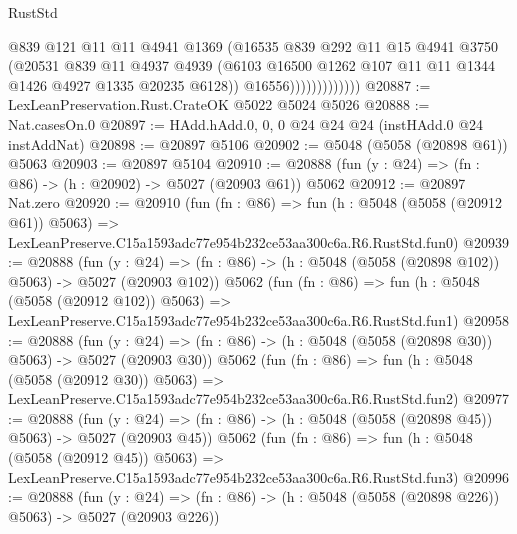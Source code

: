 \begin{lexlean}{RustStd}
\begin{coremodule}
                            @839
                            @121
                            @11
                            @11
                            @4941
                            @1369
                            (@16535
                              @839
                              @292
                              @11
                              @15
                              @4941
                              @3750
                              (@20531
                                @839
                                @11
                                @4937
                                @4939
                                (@6103
                                  @16500
                                  @1262
                                  @107
                                  @11
                                  @11
                                  @1344
                                  @1426
                                  @4927
                                  @1335
                                  @20235
                                  @6128))
                              @16556)))))))))))))
@20887 := LexLeanPreservation.Rust.CrateOK @5022 @5024 @5026
@20888 := Nat.casesOn.{0}
@20897 := HAdd.hAdd.{0, 0, 0} @24 @24 @24 (instHAdd.{0} @24 instAddNat)
@20898 := @20897 @5106
@20902 := @5048 (@5058 (@20898 @61)) @5063
@20903 := @20897 @5104
@20910 := @20888 (fun (y : @24) => (fn : @86) -> (h : @20902) -> @5027 (@20903 @61)) @5062
@20912 := @20897 Nat.zero
@20920 := @20910
    (fun (fn : @86) =>
    fun (h : @5048 (@5058 (@20912 @61)) @5063) =>
    LexLeanPreserve.C15a1593adc77e954b232ce53aa300c6a.R6.RustStd.fun0)
@20939 := @20888
    (fun (y : @24) => (fn : @86) -> (h : @5048 (@5058 (@20898 @102)) @5063) -> @5027 (@20903 @102))
    @5062
    (fun (fn : @86) =>
    fun (h : @5048 (@5058 (@20912 @102)) @5063) =>
    LexLeanPreserve.C15a1593adc77e954b232ce53aa300c6a.R6.RustStd.fun1)
@20958 := @20888
    (fun (y : @24) => (fn : @86) -> (h : @5048 (@5058 (@20898 @30)) @5063) -> @5027 (@20903 @30))
    @5062
    (fun (fn : @86) =>
    fun (h : @5048 (@5058 (@20912 @30)) @5063) =>
    LexLeanPreserve.C15a1593adc77e954b232ce53aa300c6a.R6.RustStd.fun2)
@20977 := @20888
    (fun (y : @24) => (fn : @86) -> (h : @5048 (@5058 (@20898 @45)) @5063) -> @5027 (@20903 @45))
    @5062
    (fun (fn : @86) =>
    fun (h : @5048 (@5058 (@20912 @45)) @5063) =>
    LexLeanPreserve.C15a1593adc77e954b232ce53aa300c6a.R6.RustStd.fun3)
@20996 := @20888
    (fun (y : @24) => (fn : @86) -> (h : @5048 (@5058 (@20898 @226)) @5063) -> @5027 (@20903 @226))

\end{coremodule}
\end{lexlean}
